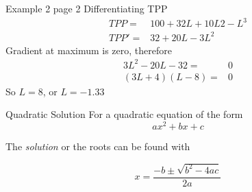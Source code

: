 \documentclass[14pt,xcolor=pdftex,dvipsnames,table, handout]{beamer}
\begin{document}
\begin{frame}{Example 2 page 2}
{Differentiating TPP}
\begin{align*}
TPP  =& 100 + 32L + 10L2 - L^3\\
TPP' =& 32 +20L -3L^2
\end{align*}
Gradient at maximum is zero, therefore
\begin{align*}
3L^2 - 20L -32 = & 0\\
(3L + 4)(L - 8) =& 0
\end{align*}
So $L = 8$, or $L = -1.33$ 
\end{frame}

\begin{frame}{Quadratic Solution}
For a quadratic equation of the form
\begin{equation*}
ax^2 +bx + c
\end{equation*}

The \emph{solution} or the roots can be found with 
\begin{block}{}
\begin{equation*}
x = \frac{-b \pm \sqrt{b^2 - 4ac}}{2a}
\end{equation*}
\end{block}
\end{frame}
\end{document}
